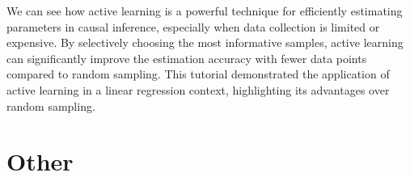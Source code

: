 \documentclass[letterpaper,10pt,english]{jupyterBook}
\begin{document}
\sphinxAtStartPar
We can see how active learning is a powerful technique for efficiently estimating parameters in causal inference, especially when data collection is limited or expensive. By selectively choosing the most informative samples, active learning can significantly improve the estimation accuracy with fewer data points compared to random sampling. This tutorial demonstrated the application of active learning in a linear regression context, highlighting its advantages over random sampling.

\sphinxstepscope


\part{Other}

\sphinxstepscope
\end{document}
